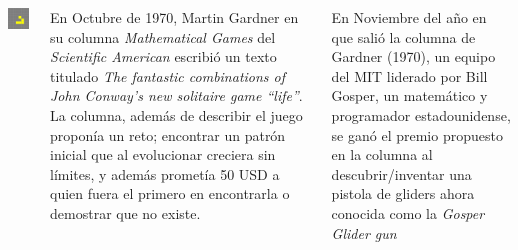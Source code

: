\documentclass[20pt,margin=2.2cm,innermargin=-4.5in,blockverticalspace=-0.25in]{tikzposter}
\begin{document}
\begin{columns}
{\begin{minipage}[t]{\linewidth}
\begin{minipage}[t]{0.15\linewidth}
            \end{minipage}
            \begin{minipage}[t]{0.15\linewidth}
                \includegraphics[width=\textwidth]{images/life-glider-5.png}
            \end{minipage}
        \end{minipage}

        \vspace{5mm}
        En Octubre de 1970, Martin Gardner en su columna \textit{Mathematical Games} del \textit{Scientific American} \cite{Gardner1970} escribi\'o un texto titulado \textit{The fantastic combinations of John Conway's new solitaire game ``life''}. La columna, adem\'as de describir el juego propon\'ia un reto; encontrar un patr\'on inicial que al evolucionar creciera sin l\'imites, y adem\'as promet\'ia 50 USD a quien fuera el primero en encontrarla o demostrar que no existe.

        En Noviembre del a\~no en que sali\'o la columna de Gardner (1970), un equipo del MIT liderado por Bill Gosper, un matem\'atico y programador estadounidense, se gan\'o el premio propuesto en la columna al descubrir/inventar una pistola de gliders ahora conocida como la \textit{Gosper Glider gun}
        \vspace{7mm}

}
\end{columns}
\end{document}
